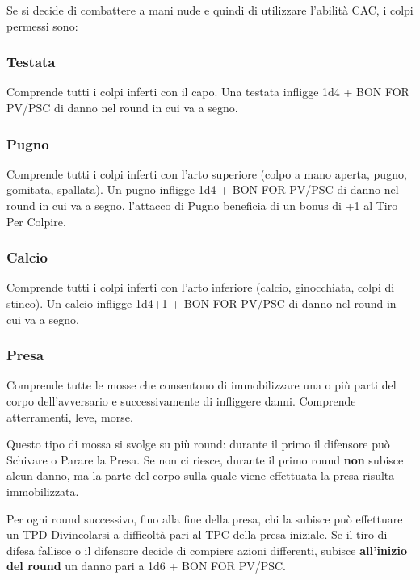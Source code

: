 Se si decide di combattere a
mani nude e quindi di utilizzare l'abilit\`a CAC, i colpi permessi
sono:

\iffullversion
\subsubsection{Testata} Comprende tutti i colpi inferti con il capo.
Una testata infligge 1d4 + BON FOR PV/PSC di danno nel round in cui va
a segno.
\fi

\subsubsection{Pugno}
Comprende tutti i colpi inferti con l'arto superiore (colpo a mano
aperta, pugno, gomitata, spallata).  Un pugno infligge 1d4 + BON FOR
PV/PSC di danno nel round in cui va a segno.  l'attacco di Pugno
beneficia di un bonus di +1 al Tiro Per Colpire.


\subsubsection{Calcio} Comprende
  tutti i colpi inferti con l'arto inferiore (calcio, ginocchiata,
  colpi di stinco). Un calcio infligge 1d4+1 + BON FOR PV/PSC di danno
  nel round in cui va a segno.

\iffullversion
\subsubsection{Presa} Comprende tutte le mosse
che consentono di immobilizzare una o pi\`u parti del corpo
dell'avversario e successivamente di infliggere danni. Comprende
atterramenti, leve, morse.

Questo tipo di mossa si svolge su pi\`u round: durante il primo il
difensore pu\`o Schivare o Parare la Presa. Se non ci riesce,
durante il primo round \textbf{non} subisce alcun danno, ma la parte del corpo
sulla quale viene effettuata la presa risulta immobilizzata. 

Per ogni round successivo, fino alla fine della presa, chi la subisce
pu\`o effettuare un TPD Divincolarsi a difficolt\`a pari al TPC
della presa iniziale. Se il tiro di difesa fallisce o il difensore
decide di compiere azioni differenti, subisce \textbf{all'inizio del round} un
danno pari a 1d6 + BON FOR PV/PSC.

